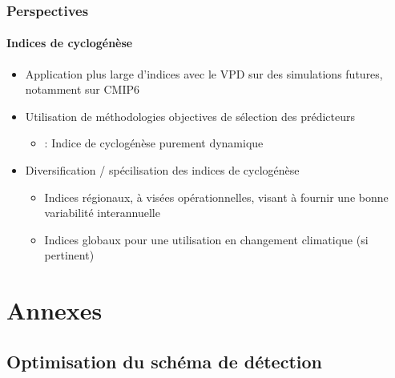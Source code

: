 \documentclass[aspectratio=169, usepdftitle=false, xcolor={dvipsnames}, 9pt,table]{beamer}
\begin{document}
\begin{frame}[c]
    \frametitle{Perspectives}
    \framesubtitle{Indices de cyclogénèse}
    \begin{block}
        \small
        \begin{itemize}
            \setlength{\itemsep}{2ex}
            \item Application plus large d'indices avec le VPD sur des simulations futures, notamment sur CMIP6
            \item Utilisation de méthodologies objectives de sélection des prédicteurs
                \begin{itemize}
                    \item \cite{wang_dynamic_2020,murakami_patterns_2022} : Indice de cyclogénèse purement dynamique
                \end{itemize}
            \item Diversification / spécilisation des indices de cyclogénèse
                \begin{itemize}
                    \item Indices régionaux, à visées opérationnelles, visant à fournir une bonne variabilité interannuelle
                    \item Indices globaux pour une utilisation en changement climatique (si pertinent)
                \end{itemize}
        \end{itemize}
    \end{block}
\end{frame}

\makethankyouslide

%

\appendix
\section*{Annexes}
\subsection*{Optimisation du schéma de détection}
\end{document}
